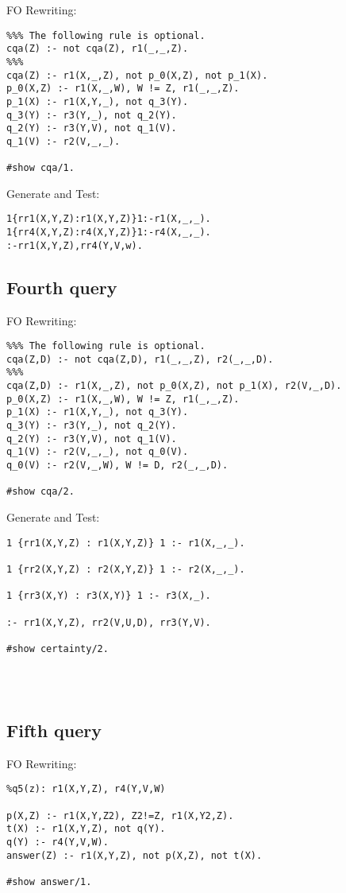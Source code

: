 FO Rewriting:
\begin{lstlisting}
%%% The following rule is optional.
cqa(Z) :- not cqa(Z), r1(_,_,Z).
%%%
cqa(Z) :- r1(X,_,Z), not p_0(X,Z), not p_1(X).
p_0(X,Z) :- r1(X,_,W), W != Z, r1(_,_,Z).
p_1(X) :- r1(X,Y,_), not q_3(Y).
q_3(Y) :- r3(Y,_), not q_2(Y).
q_2(Y) :- r3(Y,V), not q_1(V).
q_1(V) :- r2(V,_,_).

#show cqa/1.

\end{lstlisting}

Generate and Test:
\begin{lstlisting}
1{rr1(X,Y,Z):r1(X,Y,Z)}1:-r1(X,_,_).
1{rr4(X,Y,Z):r4(X,Y,Z)}1:-r4(X,_,_).
:-rr1(X,Y,Z),rr4(Y,V,w).

\end{lstlisting}

\subsection{Fourth query}

FO Rewriting:
\begin{lstlisting}
%%% The following rule is optional.
cqa(Z,D) :- not cqa(Z,D), r1(_,_,Z), r2(_,_,D).
%%%
cqa(Z,D) :- r1(X,_,Z), not p_0(X,Z), not p_1(X), r2(V,_,D).
p_0(X,Z) :- r1(X,_,W), W != Z, r1(_,_,Z).
p_1(X) :- r1(X,Y,_), not q_3(Y).
q_3(Y) :- r3(Y,_), not q_2(Y).
q_2(Y) :- r3(Y,V), not q_1(V).
q_1(V) :- r2(V,_,_), not q_0(V).
q_0(V) :- r2(V,_,W), W != D, r2(_,_,D).

#show cqa/2.

\end{lstlisting}

Generate and Test:
\begin{lstlisting}
1 {rr1(X,Y,Z) : r1(X,Y,Z)} 1 :- r1(X,_,_).

1 {rr2(X,Y,Z) : r2(X,Y,Z)} 1 :- r2(X,_,_).

1 {rr3(X,Y) : r3(X,Y)} 1 :- r3(X,_).

:- rr1(X,Y,Z), rr2(V,U,D), rr3(Y,V).

#show certainty/2.




\end{lstlisting}


\subsection{Fifth query}

FO Rewriting:
\begin{lstlisting}
%q5(z): r1(X,Y,Z), r4(Y,V,W)

p(X,Z) :- r1(X,Y,Z2), Z2!=Z, r1(X,Y2,Z).
t(X) :- r1(X,Y,Z), not q(Y).
q(Y) :- r4(Y,V,W).
answer(Z) :- r1(X,Y,Z), not p(X,Z), not t(X).

#show answer/1.
\end{lstlisting}

